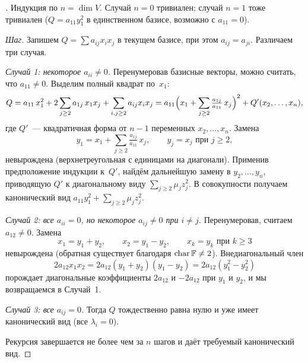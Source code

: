 \begin{proof}[]
Индукция по $n = \dim V$. Случай $n = 0$ тривиален; случай $n = 1$
тоже тривиален ($Q = a_{11} y_1^2$ в единственном базисе, возможно с
$a_{11} = 0$).

\emph{Шаг.} Запишем $Q = \sum a_{ij} x_i x_j$ в текущем базисе, при
этом $a_{ij} = a_{ji}$. Различаем три случая.

\emph{Случай 1: некоторое $a_{ii} \neq 0$.} Перенумеровав базисные
векторы, можно считать, что $a_{11} \neq 0$. Выделим полный квадрат
по~$x_1$:
\[
  Q = a_{11}\,x_1^2 + 2 \sum_{j \ge 2} a_{1j}\, x_1 x_j + \sum_{i, j \ge 2} a_{ij} x_i x_j
   = a_{11}\Bigl(x_1 + \sum_{j \ge 2} \tfrac{a_{1j}}{a_{11}}\,x_j\Bigr)^2 + Q'(x_2, \dots, x_n),
\]
где $Q'$~--- квадратичная форма от $n - 1$ переменных
$x_2, \dots, x_n$. Замена
\[
  y_1 = x_1 + \sum_{j \ge 2} \tfrac{a_{1j}}{a_{11}}\, x_j, \qquad y_j = x_j \text{ при } j \ge 2,
\]
невырождена (верхнетреугольная с единицами на диагонали). Применив
предположение индукции к~$Q'$, найдём дальнейшую замену в
$y_2, \dots, y_n$, приводящую $Q'$ к диагональному виду
$\sum_{j \ge 2} \mu_j z_j^2$. В совокупности получаем канонический вид
$a_{11} y_1^2 + \sum_{j \ge 2} \mu_j z_j^2$.

\emph{Случай 2: все $a_{ii} = 0$, но некоторое $a_{ij} \neq 0$ при $i \neq j$.}
Перенумеровав, считаем $a_{12} \neq 0$. Замена
\[
  x_1 = y_1 + y_2, \qquad x_2 = y_1 - y_2, \qquad x_k = y_k \text{ при } k \ge 3
\]
невырождена (обратная существует благодаря $\operatorname{char} \mathbb{F} \neq 2$).
Внедиагональный член
\[
  2 a_{12} x_1 x_2 = 2 a_{12} (y_1 + y_2)(y_1 - y_2) = 2 a_{12} (y_1^2 - y_2^2)
\]
порождает диагональные коэффициенты $2 a_{12}$ и $-2 a_{12}$ при
$y_1$ и $y_2$, и мы возвращаемся в Случай~1.

\emph{Случай 3: все $a_{ij} = 0$.} Тогда $Q$ тождественно равна нулю
и уже имеет канонический вид (все $\lambda_i = 0$).

Рекурсия завершается не более чем за $n$ шагов и даёт требуемый
канонический вид.
\end{proof}

